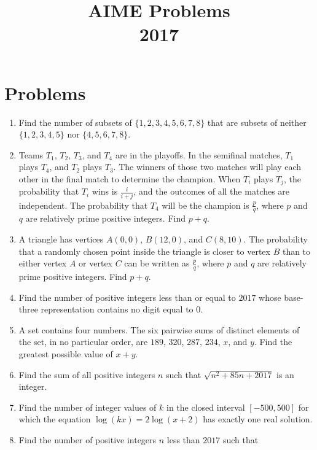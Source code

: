 \documentclass{article}
\title{AIME Problems \\ 2017}
\date{}
\begin{document}
\maketitle\thispagestyle{fancy}\newpage\section*{Problems}\begin{enumerate}[label=\arabic*., itemsep=0.5em]\item Find the number of subsets of $\{1, 2, 3, 4, 5, 6, 7, 8\}$ that are subsets of neither $\{1, 2, 3, 4, 5\}$ nor $\{4, 5, 6, 7, 8\}$.\par \vspace{0.5em}\item Teams $T_1$, $T_2$, $T_3$, and $T_4$ are in the playoffs. In the semifinal matches, $T_1$ plays $T_4$, and $T_2$ plays $T_3$. The winners of those two matches will play each other in the final match to determine the champion. When $T_i$ plays $T_j$, the probability that $T_i$ wins is $\frac{i}{i+j}$, and the outcomes of all the matches are independent. The probability that $T_4$ will be the champion is $\frac{p}{q}$, where $p$ and $q$ are relatively prime positive integers. Find $p+q$.\par \vspace{0.5em}\item A triangle has vertices $A(0,0)$, $B(12,0)$, and $C(8,10)$. The probability that a randomly chosen point inside the triangle is closer to vertex $B$ than to either vertex $A$ or vertex $C$ can be written as $\frac{p}{q}$, where $p$ and $q$ are relatively prime positive integers. Find $p+q$.\par \vspace{0.5em}\item Find the number of positive integers less than or equal to $2017$ whose base-three representation contains no digit equal to $0$.\par \vspace{0.5em}\item A set contains four numbers. The six pairwise sums of distinct elements of the set, in no particular order, are $189$, $320$, $287$, $234$, $x$, and $y$. Find the greatest possible value of $x+y$.\par \vspace{0.5em}\item Find the sum of all positive integers $n$ such that $\sqrt{n^2+85n+2017}$ is an integer.\par \vspace{0.5em}\item Find the number of integer values of $k$ in the closed interval $[-500,500]$ for which the equation $\log(kx)=2\log(x+2)$ has exactly one real solution.\par \vspace{0.5em}\item Find the number of positive integers $n$ less than $2017$ such that 

\end{enumerate}
\end{document}
